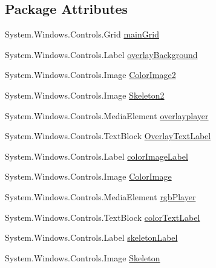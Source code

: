 \subsection*{Package Attributes}
\begin{DoxyCompactItemize}
\item 
System.\-Windows.\-Controls.\-Grid \hyperlink{classUTKinectSkeletonMovementDetector_1_1MainWindow_a46d4c23e930d0705872fd70635bae665}{main\-Grid}
\item 
System.\-Windows.\-Controls.\-Label \hyperlink{classUTKinectSkeletonMovementDetector_1_1MainWindow_a172dcddd5dc71b907f9626554e776978}{overlay\-Background}
\item 
System.\-Windows.\-Controls.\-Image \hyperlink{classUTKinectSkeletonMovementDetector_1_1MainWindow_aae3b6a465781c6d9ed0b82a7e1d43747}{Color\-Image2}
\item 
System.\-Windows.\-Controls.\-Image \hyperlink{classUTKinectSkeletonMovementDetector_1_1MainWindow_ae21b0af522b79668c8ac5b0cf3c75dfe}{Skeleton2}
\item 
System.\-Windows.\-Controls.\-Media\-Element \hyperlink{classUTKinectSkeletonMovementDetector_1_1MainWindow_a1e50e8d30594f7981c6c7c358301cd13}{overlayplayer}
\item 
System.\-Windows.\-Controls.\-Text\-Block \hyperlink{classUTKinectSkeletonMovementDetector_1_1MainWindow_a0b448bc865a6b976d21b69c608c8b151}{Overlay\-Text\-Label}
\item 
System.\-Windows.\-Controls.\-Label \hyperlink{classUTKinectSkeletonMovementDetector_1_1MainWindow_a8b899fad7c2174e584a125de7b741b7d}{color\-Image\-Label}
\item 
System.\-Windows.\-Controls.\-Image \hyperlink{classUTKinectSkeletonMovementDetector_1_1MainWindow_a728c5e61f6b85860e5f4a1c50a17bf50}{Color\-Image}
\item 
System.\-Windows.\-Controls.\-Media\-Element \hyperlink{classUTKinectSkeletonMovementDetector_1_1MainWindow_a58c45dd8fca2bc7a80271a66c290edd1}{rgb\-Player}
\item 
System.\-Windows.\-Controls.\-Text\-Block \hyperlink{classUTKinectSkeletonMovementDetector_1_1MainWindow_a72cb0dc6d60075ec8fb0824fd2cf1cd2}{color\-Text\-Label}
\item 
System.\-Windows.\-Controls.\-Label \hyperlink{classUTKinectSkeletonMovementDetector_1_1MainWindow_af7cf24ac85e9a4e6cd0f6b735fe2674b}{skeleton\-Label}
\item 
System.\-Windows.\-Controls.\-Image \hyperlink{classUTKinectSkeletonMovementDetector_1_1MainWindow_aeaae83e3e199c75e2975b19e7f9e881e}{Skeleton}

\end{DoxyCompactItemize}
